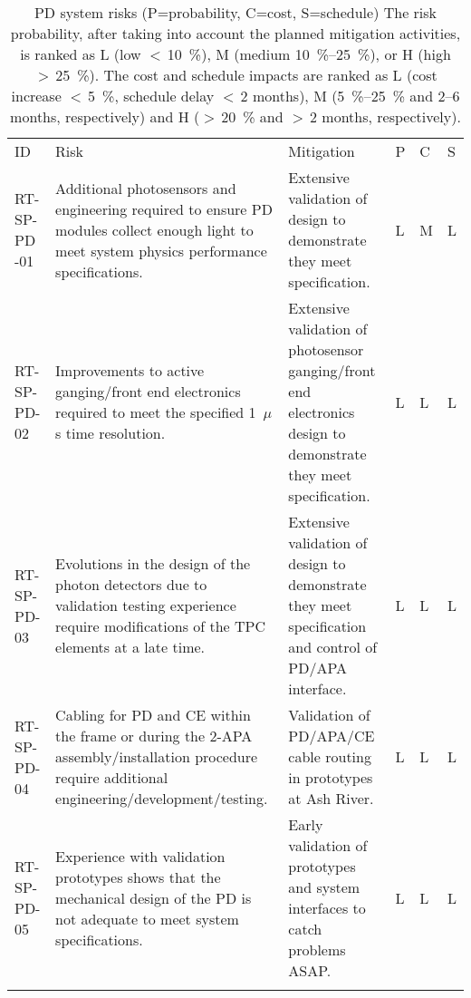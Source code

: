 
\begin{footnotesize}
\begin{longtable}{P{0.18\textwidth}P{0.20\textwidth}P{0.32\textwidth}P{0.02\textwidth}P{0.02\textwidth}P{0.02\textwidth}} 
\caption[PD system risks]{PD system risks (P=probability, C=cost, S=schedule) The risk probability, after taking into account the planned mitigation activities, is ranked as 
L (low $<\,$\SI{10}{\%}), 
M (medium \SIrange{10}{25}{\%}), or 
H (high $>\,$\SI{25}{\%}). 
The cost and schedule impacts are ranked as 
L (cost increase $<\,$\SI{5}{\%}, schedule delay $<\,$\num{2} months), 
M (\SIrange{5}{25}{\%} and 2--6 months, respectively) and 
H ($>\,$\SI{20}{\%} and $>\,$2 months, respectively). } \\
ID & Risk & Mitigation & P & C & S  \\  \colhline
RT-SP-PD -01 & Additional photosensors and engineering required to ensure PD modules collect enough light to meet system physics performance specifications. & Extensive validation of  design to demonstrate they meet specification. & L & M & L \\  \colhline
RT-SP-PD-02 & Improvements to active ganging/front end electronics required to meet the specified 1~$\mu$s time resolution. & Extensive validation of photosensor ganging/front end electronics design to demonstrate they meet specification. & L & L & L \\  \colhline
RT-SP-PD-03 & Evolutions in the design of the photon detectors due to validation testing experience require modifications of the TPC elements at a late time. & Extensive validation of  design to demonstrate they meet specification and control of PD/APA interface. & L & L & L \\  \colhline
RT-SP-PD-04 & Cabling for PD and CE within the  frame or during the 2-APA assembly/installation procedure require additional engineering/development/testing. & Validation of PD/APA/CE cable routing in prototypes at Ash River. & L & L & L \\  \colhline
RT-SP-PD-05 & Experience with validation prototypes shows that the mechanical design of the PD is not adequate to meet system specifications. & Early validation of  prototypes and system interfaces to catch problems ASAP. & L & L & L \\  \colhline

\end{longtable}
\end{footnotesize}
